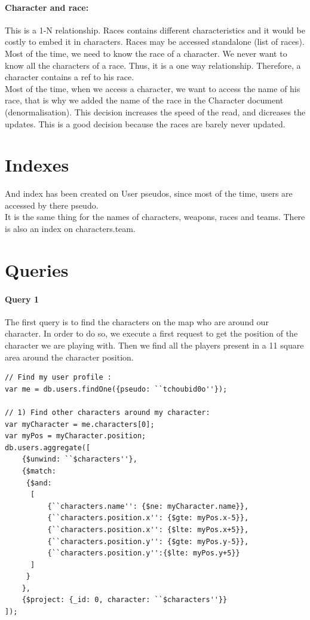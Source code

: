 \documentclass[a4paper, 11pt]{article}
\begin{document}
\paragraph{Character and race:}
This is a 1-N relationship. Races contains different characteristics and it would be costly to embed it in characters. Races may be accessed standalone (list of races). Most of the time, we need to know the race of a character. We never want to know all the characters of a race. Thus, it is a one way relationship. Therefore, a character contains a ref to his race. \\
Most of the time, when we access a character, we want to access the name of his race, that is why we added the name of the race in the Character document (denormalisation). This decision increases the speed of the read, and dicreases the updates. This is a good decision because the races are barely never updated.




\section{Indexes}
And index has been created on User pseudos, since most of the time, users are accessed by there pseudo.\\
It is the same thing for the names of characters, weapons, races and teams.
There is also an index on characters.team.

\section{Queries}
\paragraph*{Query 1\\}
The first query is to find the characters on the map who are around our character. In order to do so, we execute a first request to get the position of the character we are playing with. Then we find all the players present in a 11 square area around the character position.

\begin{lstlisting}
// Find my user profile : 
var me = db.users.findOne({pseudo: ``tchoubid0o''});

// 1) Find other characters around my character:
var myCharacter = me.characters[0];
var myPos = myCharacter.position;
db.users.aggregate([
    {$unwind: ``$characters''}, 
    {$match: 
     {$and: 
      [
          {``characters.name'': {$ne: myCharacter.name}},
          {``characters.position.x'': {$gte: myPos.x-5}}, 
          {``characters.position.x'': {$lte: myPos.x+5}}, 
          {``characters.position.y'': {$gte: myPos.y-5}}, 
          {``characters.position.y'':{$lte: myPos.y+5}}
      ]
     }
    },
    {$project: {_id: 0, character: ``$characters''}}
]);
\end{lstlisting}
\end{document}
